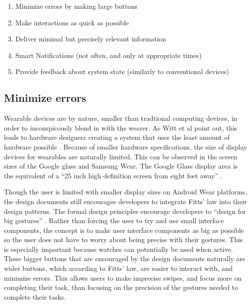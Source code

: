 \documentclass[12pt]{article}
\begin{document}
\begin{enumerate}
\item{Minimize errors by making large buttons}
\item{Make interactions as quick as possible}
\item{Deliver minimal but precisely relevant information}
\item{Smart Notifications (not often, and only at appropriate times)}
\item{Provide feedback about system state (similarly to conventional devices)}
\end{enumerate}

\subsection{Minimize errors}
Wearable devices are by nature, smaller than tradtional computing devices, in order to inconspicously blend in with the wearer. As Witt et al point out, this leads to hardware designers creating a system that uses the least amount of hardware possible \cite{witt}. Because of smaller hardware specifications, the size of display devices for wearables are naturally limited. This can be observed in the screen sizes of the Google glass and Samsung Wear. The Google Glass display area is the equivalent of a ``25 inch high definition screen from eight feet away'' \cite{goog2}.

Though the user is limited with smaller display sizes on Android Wear platforms, the design documents still encourages developers to integrate Fitts' law into their design patterns. The formal design principles encourage developers to ``design for big gestures'' \cite{andr}. Rather than forcing the user to try and use small interface components, the concept is to make user interface components as big as possible so the user does not have to worry about being precise with their gestures. This is especially important because watches can potentially be used when active. These bigger buttons that are encouraged by the design documents naturally are wider buttons, which according to Fitts' law, are easier to interact with, and minimize errors. This allows users to make imprecise swipes, and focus more on completing their task, than focusing on the precision of the gestures needed to complete their tasks.
\end{document}
